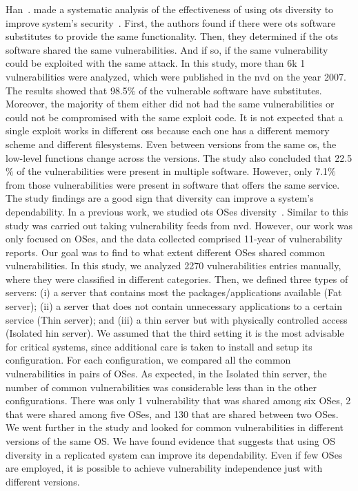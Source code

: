 Han~\etal{}. made a systematic analysis of the effectiveness of using \gls{ots} diversity to improve system's security~\cite{Han:2009}. 
First, the authors found if there were \gls{ots} software substitutes to provide the same functionality. 
Then, they determined if the \gls{ots} software shared the same vulnerabilities.
And if so, if the same vulnerability could be exploited with the same attack. 
In this study, more than 6k 1 vulnerabilities were analyzed, which were published in the \gls{nvd} on the year 2007. 
The results showed that 98.5$\%$ of the vulnerable software have substitutes. 
Moreover, the majority of them either did not had the same vulnerabilities or could not be compromised with the same exploit code. 
It is not expected that a single exploit works in different \glspl{os} because each one has a different memory scheme and different filesystems. 
Even between versions from the same \gls{os}, the low-level functions change across the versions. 
The study also concluded that 22.5$\%$ of the vulnerabilities were present in multiple software. 
However, only 7.1$\%$ from those vulnerabilities were present in software that offers the same service. 
The study findings are a good sign that diversity can improve a system’s dependability.
In a previous work, we studied \gls{ots} OSes diversity~\cite{Garcia:2014}. 
Similar to \cite{Han:2009} this study was carried out taking vulnerability feeds from \gls{nvd}. 
However, our work was only focused on OSes, and the data collected comprised 11-year of vulnerability reports. 
Our goal was to find to what extent different OSes shared common vulnerabilities. 
In this study, we analyzed 2270 vulnerabilities entries manually, where they were classified in different categories. 
Then, we defined three types of servers: (i) a server that contains most the packages/applications available (Fat server); (ii) a server that does not contain unnecessary applications to a certain
service (Thin server); and (iii) a thin server but with physically controlled access (Isolated hin server). 
We assumed that the third setting it is the most advisable for critical systems, since additional care is taken to install and setup its configuration. 
For each configuration, we compared all the common vulnerabilities in pairs of OSes. 
As expected, in the Isolated thin server, the number of common vulnerabilities was considerable less than in the other configurations. 
There was only 1 vulnerability that was shared among six OSes, 2 that were shared among five OSes, and 130 that are shared between two OSes. 
We went further in the study and looked for common vulnerabilities in different versions of the same OS. 
We have found evidence that suggests that using OS diversity in a replicated system can improve its dependability. 
Even if few OSes are employed, it is possible to achieve vulnerability independence just with different versions.



